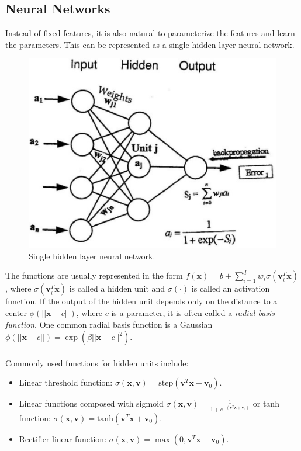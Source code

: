 \documentclass{article}
\begin{document}
   \subsection{Neural Networks}
   Instead of fixed features, it is also natural to parameterize the features and learn the parameters. This can be represented as a single hidden layer neural network. 
   
   \begin{figure}[h!]
   \centering
   \includegraphics[width=.6\linewidth]{nn}
   \caption{Single hidden layer neural network.} 
   \end{figure} 
   
   \noindent The functions are usually represented in the form $f(\mathbf{x}) = b+ \sum_{i=1}^d w_i \sigma(\mathbf{v}_i^T\mathbf{x})$, where $\sigma(\mathbf{v}_i^T\mathbf{x})$ is called a hidden unit and $\sigma(\cdot)$ is called an activation function. If the output of the hidden unit depends only on the distance to a center $\phi(||\mathbf{x}-c||)$, where $c$ is a parameter, it is often called a \textit{radial basis function}. One common radial basis function is a Gaussian $\phi(||\mathbf{x}-c||) = \exp(\beta ||\mathbf{x}-c||^2)$.
   \\\\
   Commonly used functions for hidden units include:
   \begin{itemize}
   \item Linear threshold function: $\sigma(\mathbf{x},\mathbf{v}) = \text{step}(\mathbf{v}^T\mathbf{x}+\mathbf{v}_0)$.
   \item Linear functions composed with sigmoid $\sigma(\mathbf{x},\mathbf{v}) = \frac{1}{1+e^{-(\mathbf{v}^T\mathbf{x}+\mathbf{v}_0)}}$ or tanh function: $\sigma(\mathbf{x},\mathbf{v}) = \text{tanh}(\mathbf{v}^T\mathbf{x}+\mathbf{v}_0)$. 
   \item Rectifier linear function: $\sigma(\mathbf{x},\mathbf{v}) = \max (0, \mathbf{v}^T\mathbf{x}+\mathbf{v}_0)$.
   \end{itemize}
   
\end{document}
